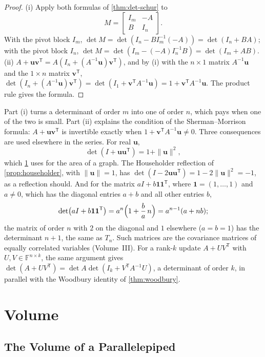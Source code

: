 \begin{proof}
(i) Apply both formulas of \cref{thm:det-schur} to
\[
M=\begin{bmatrix}I_m&-A\\B&I_n\end{bmatrix}.
\]
With the pivot block $I_m$, $\det M=\det(I_n-BI_m^{-1}(-A))=\det(I_n+BA)$; with the pivot block $I_n$, $\det M=\det(I_m-(-A)I_n^{-1}B)=\det(I_m+AB)$. (ii) $A+\mathbf u\mathbf v^{\mathsf T}=A(I_n+(A^{-1}\mathbf u)\mathbf v^{\mathsf T})$, and by (i) with the $n\times1$ matrix $A^{-1}\mathbf u$ and the $1\times n$ matrix $\mathbf v^{\mathsf T}$, $\det(I_n+(A^{-1}\mathbf u)\mathbf v^{\mathsf T})=\det(I_1+\mathbf v^{\mathsf T}A^{-1}\mathbf u)=1+\mathbf v^{\mathsf T}A^{-1}\mathbf u$. The product rule gives the formula.
\end{proof}

Part (i) turns a determinant of order $m$ into one of order $n$, which pays when one of the two is small. Part (ii) explains the condition of the Sherman--Morrison formula: $A+\mathbf u\mathbf v^{\mathsf T}$ is invertible exactly when $1+\mathbf v^{\mathsf T}A^{-1}\mathbf u\ne0$. Three consequences are used elsewhere in the series. For real $\mathbf u$,
\[
\det(I+\mathbf u\mathbf u^{\mathsf T})=1+\|\mathbf u\|^2,
\]
which \cref{sec:det-volume} uses for the area of a graph. The Householder reflection of \cref{prop:householder}, with $\|\mathbf u\|=1$, has $\det(I-2\mathbf u\mathbf u^{\mathsf T})=1-2\|\mathbf u\|^2=-1$, as a reflection should. And for the matrix $aI+b\mathbf 1\mathbf 1^{\mathsf T}$, where $\mathbf 1=(1,\ldots,1)$ and $a\ne0$, which has the diagonal entries $a+b$ and all other entries $b$,
\[
\det\bigl(aI+b\mathbf 1\mathbf 1^{\mathsf T}\bigr)=a^n\Bigl(1+\frac{b}{a}\,n\Bigr)=a^{n-1}(a+nb);
\]
the matrix of order $n$ with $2$ on the diagonal and $1$ elsewhere ($a=b=1$) has the determinant $n+1$, the same as $T_n$. Such matrices are the covariance matrices of equally correlated variables (Volume~III). For a rank-$k$ update $A+UV^{\mathsf T}$ with $U,V\in\mathbb F^{n\times k}$, the same argument gives $\det(A+UV^{\mathsf T})=\det A\det(I_k+V^{\mathsf T}A^{-1}U)$, a determinant of order $k$, in parallel with the Woodbury identity of \cref{thm:woodbury}.

\section{Volume}
\label{sec:det-volume}

\subsection{The Volume of a Parallelepiped}

